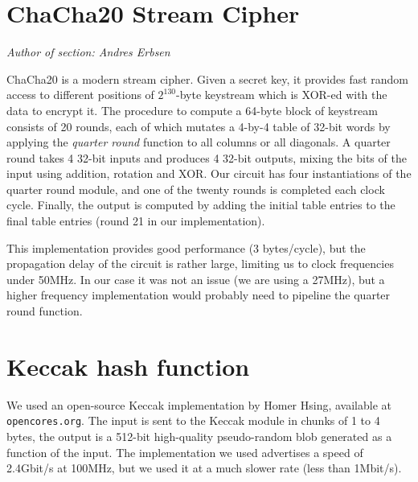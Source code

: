 \section{ChaCha20 Stream Cipher}\label{chacha20-stream-cipher}

\emph{Author of section: Andres Erbsen}

ChaCha20 is a modern stream cipher. Given a secret key, it provides fast
random access to different positions of \(2^{130}\)-byte keystream which
is XOR-ed with the data to encrypt it. The procedure to compute a
64-byte block of keystream consists of 20 rounds, each of which mutates
a 4-by-4 table of 32-bit words by applying the \emph{quarter round}
function to all columns or all diagonals. A quarter round takes 4 32-bit
inputs and produces 4 32-bit outputs, mixing the bits of the input using
addition, rotation and XOR. Our circuit has four instantiations of the
quarter round module, and one of the twenty rounds is completed each
clock cycle. Finally, the output is computed by adding the initial table
entries to the final table entries (round 21 in our implementation).

This implementation provides good performance (3 bytes/cycle), but the
propagation delay of the circuit is rather large, limiting us to clock
frequencies under 50MHz. In our case it was not an issue (we are using a
27MHz), but a higher frequency implementation would probably need to
pipeline the quarter round function.

\section{Keccak hash function}\label{keccak-hash-function}

We used an open-source Keccak implementation by Homer Hsing, available
at \texttt{opencores.org}. The input is sent to the Keccak module in
chunks of 1 to 4 bytes, the output is a 512-bit high-quality
pseudo-random blob generated as a function of the input. The
implementation we used advertises a speed of 2.4Gbit/s at 100MHz, but we
used it at a much slower rate (less than 1Mbit/s).
